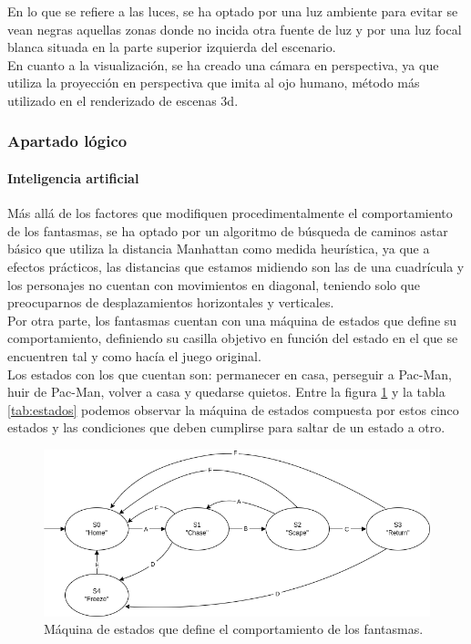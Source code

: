 En lo que se refiere a las luces, se ha optado por una luz ambiente para evitar se vean negras aquellas zonas donde no incida otra fuente de luz y por una luz focal blanca situada en la parte superior izquierda del escenario.\\

En cuanto a la visualización, se ha creado una cámara en perspectiva, ya que utiliza la proyección en perspectiva que imita al ojo humano, método más utilizado en el renderizado de escenas \acrshort{3d}.

\newpage

\subsubsection{Apartado lógico}

\paragraph{Inteligencia artificial}

Más allá de los factores que modifiquen procedimentalmente el comportamiento de los fantasmas, se ha optado por un algoritmo de búsqueda de caminos \acrshort{astar} básico que utiliza la distancia Manhattan como medida heurística, ya que a efectos prácticos, las distancias que estamos midiendo son las de una cuadrícula y los personajes no cuentan con movimientos en diagonal, teniendo solo que preocuparnos de desplazamientos horizontales y verticales.\\

Por otra parte, los fantasmas cuentan con una máquina de estados que define su comportamiento, definiendo su casilla objetivo en función del estado en el que se encuentren tal y como hacía el juego original.\\

Los estados con los que cuentan son: permanecer en casa, perseguir a Pac-Man, huir de Pac-Man, volver a casa y quedarse quietos. Entre la figura \ref{fig:estados} y la tabla \ref{tab:estados} podemos observar la máquina de estados compuesta por estos cinco estados y las condiciones que deben cumplirse para saltar de un estado a otro.\\

 \begin{figure}[H]
        \begin{center}
            \includegraphics[scale=0.6]{img/estado_fantasmas.png}
            \caption{Máquina de estados que define el comportamiento de los fantasmas.}
            \label{fig:estados}
        \end{center}
    \end{figure}    
    
